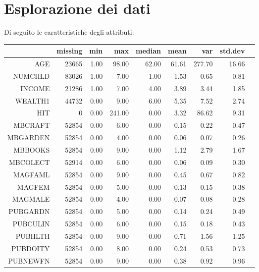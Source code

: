 \section{Esplorazione dei dati}
Di seguito le caratteristiche degli attributi:
\setlength\LTleft{-1.5cm}
\setlength\LTright{-1.5cm}
\setlength{\tabcolsep}{0.15cm}
\begin{longtable}{|rrrrrrrrr|}
	\hline
	& missing &  min  &  max  &  median  &  mean  &  var  &  std.dev& \\
	\hline
	AGE  &  23665  &  1.00  &  98.00  &  62.00  &  61.61  &  277.70  &  16.66 & \\
	NUMCHLD  &  83026  &  1.00  &  7.00  &  1.00  &  1.53  &  0.65  &  0.81 & \\
	INCOME  &  21286  &  1.00  &  7.00  &  4.00  &  3.89  &  3.44  &  1.85 & \\
	WEALTH1  &  44732  &  0.00  &  9.00  &  6.00  &  5.35  &  7.52  &  2.74 & \\
	HIT  &  0  &  0.00  &  241.00  &  0.00  &  3.32  &  86.62  &  9.31 & \\
	MBCRAFT  &  52854  &  0.00  &  6.00  &  0.00  &  0.15  &  0.22  &  0.47 & \\
	MBGARDEN  &  52854  &  0.00  &  4.00  &  0.00  &  0.06  &  0.07  &  0.26 & \\
	MBBOOKS  &  52854  &  0.00  &  9.00  &  0.00  &  1.12  &  2.79  &  1.67 & \\
	MBCOLECT  &  52914  &  0.00  &  6.00  &  0.00  &  0.06  &  0.09  &  0.30 & \\
	MAGFAML  &  52854  &  0.00  &  9.00  &  0.00  &  0.45  &  0.67  &  0.82 & \\
	MAGFEM  &  52854  &  0.00  &  5.00  &  0.00  &  0.13  &  0.15  &  0.38 & \\
	MAGMALE  &  52854  &  0.00  &  4.00  &  0.00  &  0.07  &  0.08  &  0.28 & \\
	PUBGARDN  &  52854  &  0.00  &  5.00  &  0.00  &  0.14  &  0.24  &  0.49 & \\
	PUBCULIN  &  52854  &  0.00  &  6.00  &  0.00  &  0.15  &  0.18  &  0.43 & \\
	PUBHLTH  &  52854  &  0.00  &  9.00  &  0.00  &  0.71  &  1.56  &  1.25 & \\
	PUBDOITY  &  52854  &  0.00  &  8.00  &  0.00  &  0.24  &  0.53  &  0.73 & \\
	PUBNEWFN  &  52854  &  0.00  &  9.00  &  0.00  &  0.38  &  0.92  &  0.96 & \\

\end{longtable}
